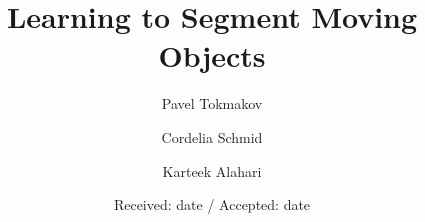 \newcommand{\sixfigures}[7]{
            \centerline{{\texttt{[image: \#1]}}~~{\texttt{[image: \#2]}}~~{\texttt{[image: \#3]}}~~{\texttt{[image: \#4]}}~~{\texttt{[image: \#5]}}~~{\texttt{[image: \#6]}}}}
            
\newcommand{\sixfiguresdots}[7]{
            \centerline{{\texttt{[image: \#1]}}~~{\texttt{[image: \#2]}}~~{\texttt{[image: \#3]}}~~{...}~~{\texttt{[image: \#4]}}~~{\texttt{[image: \#5]}}~~{\texttt{[image: \#6]}}}}            


\newcommand{\threefigurescaption}[7]{
            \centerline{{\texttt{[image: \#1]}}~~{\texttt{[image: \#2]}}~~{\texttt{[image: \#3]}}}
		     \makebox[#4][c]{#5}\makebox[#4][c]{#6}\makebox[#4][c]{#7}}

\newcommand{\comment}[1]{}

\newcommand{\twofigurescaption}[6]{
            \centerline{{\texttt{[image: \#1]}}~~{\texttt{[image: \#2]}}}
            \makebox[#6][c]{#4}\makebox[#6][c]{#5}}

\newcommand{\todo}[1]{{\bf TODO:} #1}

 
\usepackage[pagebackref=false,breaklinks=true,letterpaper=true,colorlinks,bookmarks=false]{hyperref}



\graphicspath{{figs/}}

\title{Learning to Segment Moving Objects}


\author{Pavel Tokmakov \and Cordelia Schmid \and Karteek Alahari}


\date{Received: date / Accepted: date}


\maketitle

